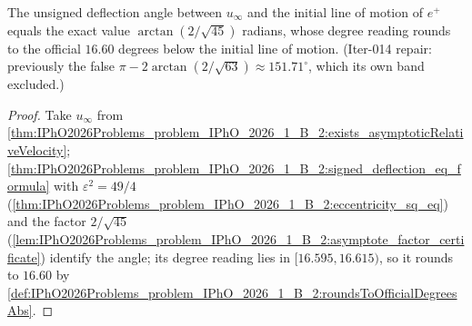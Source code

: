 \begin{theorem}
\label{thm:IPhO2026Problems_problem_IPhO_2026_1_B_2:unsigned_deflection_angle_in_degrees_T1_B2}
The unsigned deflection angle between $u_\infty$ and the initial line of
motion of $e^+$ equals the exact value $\arctan(2/\sqrt{45})$
radians, whose degree reading rounds to the official $16.60$ degrees
below the initial line of motion.
(Iter-014 repair: previously the false $\pi - 2\arctan(2/\sqrt{63})
\approx 151.71^\circ$, which its own band excluded.)
\end{theorem}
\begin{proof}
Take $u_\infty$ from
\cref{thm:IPhO2026Problems_problem_IPhO_2026_1_B_2:exists_asymptoticRelativeVelocity};
\cref{thm:IPhO2026Problems_problem_IPhO_2026_1_B_2:signed_deflection_eq_formula}
with $\varepsilon^2 = 49/4$
(\cref{thm:IPhO2026Problems_problem_IPhO_2026_1_B_2:eccentricity_sq_eq})
and the factor $2/\sqrt{45}$
(\cref{lem:IPhO2026Problems_problem_IPhO_2026_1_B_2:asymptote_factor_certificate})
identify the angle; its degree reading lies in $[16.595, 16.615)$, so it
rounds to $16.60$ by
\cref{def:IPhO2026Problems_problem_IPhO_2026_1_B_2:roundsToOfficialDegreesAbs}.
\end{proof}
